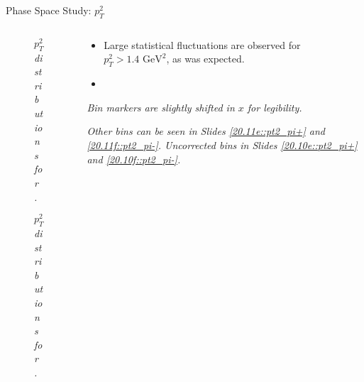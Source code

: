 \begin{frame}{Phase Space Study: $p_T^2$}
    \label{12.15::pt2}

    \begin{columns}[onlytextwidth,T]

    \begin{column}{.44\linewidth}
        \vspace{-15pt}
        \begin{center}
            \begin{figure}[t]
                \scriptsize{\textit{$p_T^2$ distributions for \ef{$\pi^-$}.}}
            \end{figure}

            \vspace{-9pt}
            \begin{figure}[t]
                \scriptsize{\textit{$p_T^2$ distributions for \ef{$\pi^+$}.}}
            \end{figure}
        \end{center}
    \end{column}

    \begin{column}{.54\linewidth}
        \begin{itemize}
            \item
                Large statistical fluctuations are observed for $p_T^2 > 1.4 \text{ GeV}^2$, as was expected.

            \vspace{12pt}
            \item
        \end{itemize}

        \vspace{105pt}

        \begin{flushright}
            \tiny{\textit{Bin markers are slightly shifted in $x$ for legibility.}}

            \vspace{-0.5pt}

            \tiny{\textit{
                Other bins can be seen in Slides \textcolor{efd_purple}{\ref{20.11e::pt2_pi+}} and \textcolor{efd_purple}{\ref{20.11f::pt2_pi-}}.
                Uncorrected bins in Slides \textcolor{efd_purple}{\ref{20.10e::pt2_pi+}} and \textcolor{efd_purple}{\ref{20.10f::pt2_pi-}}.
            }}
        \end{flushright}
    \end{column}

    \end{columns}
\end{frame}

